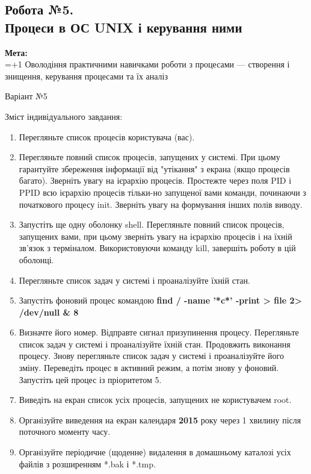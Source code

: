 \documentclass[a4paper,12pt]{article}
\begin{document}
\newpage
    \begin{center}
        \section*{\bfseries{Робота №5.\\
        Процеси в ОС UNIX і керування ними}}
    \end{center}
    \textbf{Мета:} \\
    \hangindent=1.5cm 
    \hangafter=+1 \noindent
    Оволодіння практичними навичками роботи з
    процесами — створення і знищення, керування процесами та їх аналіз \\
    \begin{center}
        \Large{Варіант №5}
    \end{center}
    Зміст індивідуального завдання:
    \begin{enumerate}
        \item Перегляньте список процесів користувача (вас).
        \item Перегляньте повний список процесів, запущених у системі. При цьому гарантуйте збереження інформації від
        "утікання" з екрана (якщо процесів багато). Зверніть увагу на ієрархію процесів. Простежте через поля PID і PPID всю
        ієрархію процесів тільки-но запущеної вами команди, починаючи з початкового процесу init. Зверніть увагу на
        формування інших полів виводу.
        \item Запустіть ще одну оболонку shell. Перегляньте повний список процесів, запущених вами, при цьому зверніть
        увагу на ієрархію процесів і на їхній зв'язок з терміналом. Використовуючи команду kill, завершіть роботу в цій оболонці.
        \item Перегляньте список задач у системі і проаналізуйте їхній стан.
        \item Запустіть фоновий процес командою
        \textbf{find / -name '*c*' -print > file 2> /dev/null \& 8}
        \item Визначте його номер. Відправте сигнал призупинення процесу. Перегляньте список задач у системі і
        проаналізуйте їхній стан. Продовжить виконання процесу. Знову перегляньте список задач у системі і проаналізуйте 
        його зміну. Переведіть процес в активний режим, а потім знову у фоновий. Запустіть цей процес із пріоритетом 5.
        \item Виведіть на екран список усіх процесів, запущених не користувачем root.
        \item Організуйте виведення на екран календаря \textbf{2015} року через 1 хвилину після поточного моменту часу.
        \item Організуйте періодичне (щоденне) видалення в домашньому каталозі усіх файлів з розширенням *.bak і *.tmp.
    \end{enumerate}
\end{document}
